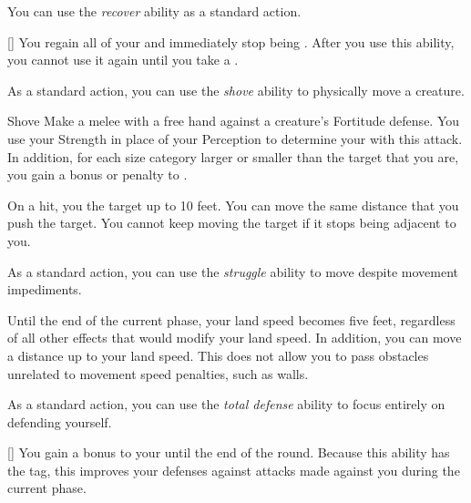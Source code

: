          You can use the \textit{recover} ability as a standard action.
        \begin{apability}{}[]
            You regain all of your  and immediately stop being .
            After you use this ability, you cannot use it again until you take a .
        \end{apability}

         As a standard action, you can use the \textit{shove} ability to physically move a creature.

        \begin{freeability}{Shove}\label{Shove}
            Make a melee  with a free hand against a creature's Fortitude defense.
            You use your Strength in place of your Perception to determine your  with this attack.
            In addition, for each size category larger or smaller than the target that you are, you gain a  bonus or penalty to .

            On a hit, you  the target up to 10 feet.
            You can move the same distance that you push the target.
            You cannot keep moving the target if it stops being adjacent to you.
        \end{freeability}

         As a standard action, you can use the \textit{struggle} ability to move despite movement impediments.

        \begin{freeability}{}
            Until the end of the current phase, your land speed becomes five feet, regardless of all other effects that would modify your land speed.
            In addition, you can move a distance up to your land speed.
            This does not allow you to pass obstacles unrelated to movement speed penalties, such as walls.
        \end{freeability}

         As a standard action, you can use the \textit{total defense} ability to focus entirely on defending yourself.

        \begin{freeability}{}[]
            You gain a  bonus to your  until the end of the round.
            Because this ability has the  tag, this improves your defenses against attacks made against you during the current phase.
        \end{freeability}

